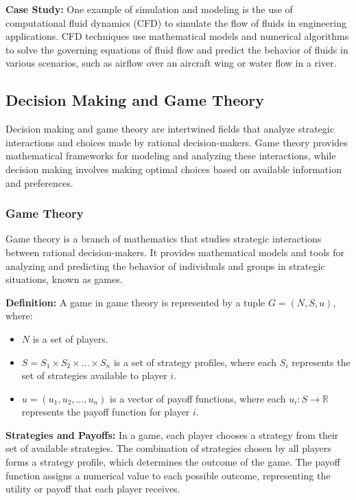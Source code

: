 \documentclass[12pt]{book} %
\begin{document}
\textbf{Case Study:} One example of simulation and modeling is the use of computational fluid dynamics (CFD) to simulate the flow of fluids in engineering applications. CFD techniques use mathematical models and numerical algorithms to solve the governing equations of fluid flow and predict the behavior of fluids in various scenarios, such as airflow over an aircraft wing or water flow in a river.

\subsection{Decision Making and Game Theory}

Decision making and game theory are intertwined fields that analyze strategic interactions and choices made by rational decision-makers. Game theory provides mathematical frameworks for modeling and analyzing these interactions, while decision making involves making optimal choices based on available information and preferences.

\subsubsection{Game Theory}

Game theory is a branch of mathematics that studies strategic interactions between rational decision-makers. It provides mathematical models and tools for analyzing and predicting the behavior of individuals and groups in strategic situations, known as games.

\textbf{Definition:} A game in game theory is represented by a tuple \(G = (N, S, u)\), where:
\begin{itemize}
    \item \(N\) is a set of players.
    \item \(S = S_1 \times S_2 \times \dots \times S_n\) is a set of strategy profiles, where each \(S_i\) represents the set of strategies available to player \(i\).
    \item \(u = (u_1, u_2, \dots, u_n)\) is a vector of payoff functions, where each \(u_i: S \rightarrow \mathbb{R}\) represents the payoff function for player \(i\).
\end{itemize}

\textbf{Strategies and Payoffs:} In a game, each player chooses a strategy from their set of available strategies. The combination of strategies chosen by all players forms a strategy profile, which determines the outcome of the game. The payoff function assigns a numerical value to each possible outcome, representing the utility or payoff that each player receives.
\end{document}

